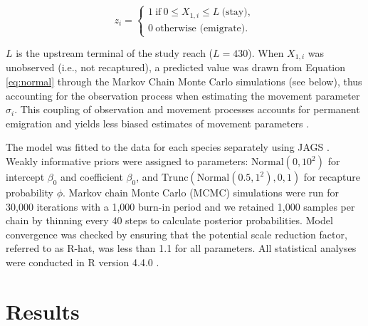 \documentclass[11pt, class=article, crop=false]{standalone}
\begin{document}
\begin{equation}
    z_i =
    \begin{cases}
        1~\text{if}~0 \le X_{1,i} \le L~\text{(stay)},\\
        0~\text{otherwise (emigrate)}.
    \end{cases}
\end{equation}

$L$ is the upstream terminal of the study reach ($L = 430$). When $X_{1,i}$ was unobserved (i.e., not recaptured), a predicted value was drawn from Equation \ref{eq:normal} through the Markov Chain Monte Carlo simulations (see below), thus accounting for the observation process when estimating the movement parameter $\sigma_i$.
This coupling of observation and movement processes accounts for permanent emigration and yields less biased estimates of movement parameters \citep{teruiModelingDispersalUsing2020}.

The model was fitted to the data for each species separately using JAGS \citep{plummerJAGSProgramAnalysis2003}. Weakly informative priors were assigned to parameters: $\text{Normal}(0, 10^2)$ for intercept $\beta_0$ and coefficient $\beta_0$, and $\text{Trunc}(\text{Normal}(0.5, 1^2), 0, 1)$ for recapture probability $\phi$. Markov chain Monte Carlo (MCMC) simulations were run for 30,000 iterations with a 1,000 burn-in period and we retained 1,000 samples per chain by thinning every 40 steps to calculate posterior probabilities. Model convergence was checked by ensuring that the potential scale reduction factor, referred to as R-hat, was less than 1.1 for all parameters. All statistical analyses were conducted in R version 4.4.0 \citep{rcoreteamLanguageEnvironmentStatistical2021}.

\section{Results}
\end{document}
